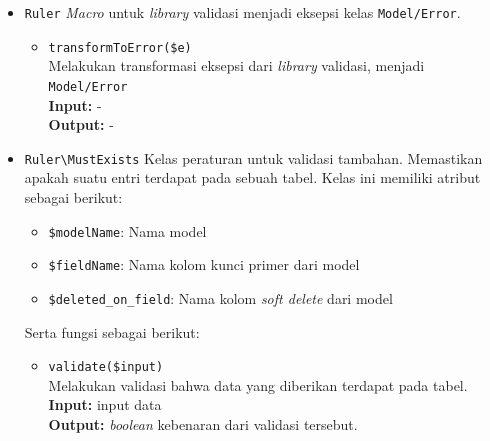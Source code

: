 \begin{itemize}
        \item \texttt{Ruler} \textit{Macro} untuk \textit{library} validasi
            menjadi eksepsi kelas \texttt{Model/Error}.
            \begin{itemize}
                \item \texttt{transformToError(\$e)} \\
                    Melakukan transformasi eksepsi dari \textit{library}
                    validasi, menjadi \texttt{Model/Error} \\
                    \textbf{Input:} -\\
                    \textbf{Output:} -
            \end{itemize}
            
        \item \texttt{Ruler\textbackslash MustExists} Kelas peraturan untuk
            validasi tambahan. Memastikan apakah suatu entri terdapat pada
            sebuah tabel. Kelas ini memiliki atribut sebagai berikut:
            \begin{itemize}
                \item \texttt{\$modelName}: Nama model
                \item \texttt{\$fieldName}: Nama kolom kunci primer dari model
                \item \texttt{\$deleted\_on\_field}: Nama kolom \textit{soft
                delete} dari model
            \end{itemize}
            Serta fungsi sebagai berikut:
            \begin{itemize}
                \item \texttt{validate(\$input)} \\
                    Melakukan validasi bahwa data yang diberikan terdapat pada
                    tabel.\\
                    \textbf{Input:} input data\\
                    \textbf{Output:} \textit{boolean} kebenaran dari validasi
                    tersebut.
            \end{itemize}
            

\end{itemize}
